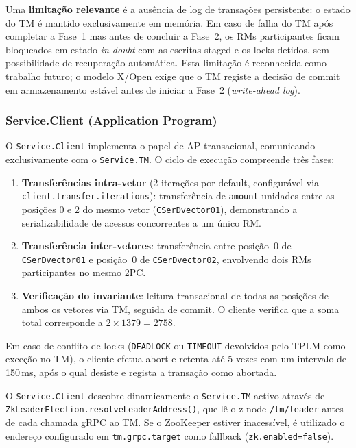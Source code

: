 Uma \textbf{limitação relevante} é a ausência de log de transações persistente: o estado do
TM é mantido exclusivamente em memória. Em caso de falha do TM após completar a Fase~1 mas
antes de concluir a Fase~2, os RMs participantes ficam bloqueados em estado
\textit{in-doubt} com as escritas staged e os locks detidos, sem possibilidade de recuperação
automática. Esta limitação é reconhecida como trabalho futuro; o modelo X/Open exige que o
TM registe a decisão de commit em armazenamento estável antes de iniciar a Fase~2
(\textit{write-ahead log}).

\subsubsection*{Service.Client (Application Program)}

O \texttt{Service.Client} implementa o papel de AP transacional, comunicando
exclusivamente com o \texttt{Service.TM}. O ciclo de execução compreende três fases:

\begin{enumerate}[label=\alph*)]
  \item \textbf{Transferências intra-vetor} (2 iterações por default, configurável via
        \texttt{client.transfer.iterations}): transferência de \texttt{amount} unidades
        entre as posições 0 e 2 do mesmo vetor (\texttt{CSerDvector01}), demonstrando a
        serializabilidade de acessos concorrentes a um único RM.
  \item \textbf{Transferência inter-vetores}: transferência entre posição~0 de
        \texttt{CSerDvector01} e posição~0 de \texttt{CSerDvector02}, envolvendo dois RMs
        participantes no mesmo 2PC.
  \item \textbf{Verificação do invariante}: leitura transacional de todas as posições de
        ambos os vetores via TM, seguida de commit. O cliente verifica que a soma total
        corresponde a $2 \times 1379 = 2758$.
\end{enumerate}

Em caso de conflito de locks (\texttt{DEADLOCK} ou \texttt{TIMEOUT} devolvidos pelo TPLM
como exceção no TM), o cliente efetua abort e retenta até 5 vezes com um intervalo de 150\,ms,
após o qual desiste e regista a transação como abortada.

O \texttt{Service.Client} descobre dinamicamente o \texttt{Service.TM} activo através de
\texttt{ZkLeaderElection.resolveLeaderAddress()}, que lê o z-node \texttt{/tm/leader} antes
de cada chamada gRPC ao TM. Se o ZooKeeper estiver inacessível, é utilizado o endereço
configurado em \texttt{tm.grpc.target} como fallback (\texttt{zk.enabled=false}).

